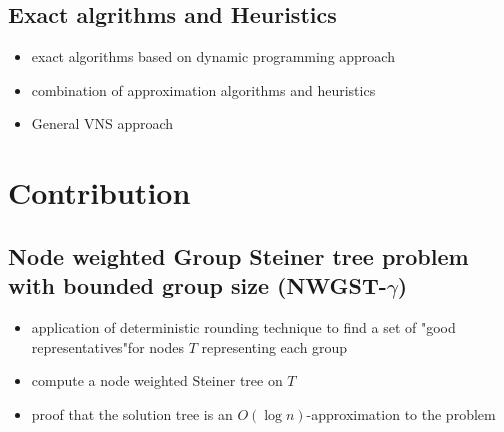\documentclass{beamer}
\begin{document}
\subsection*{Exact algrithms and Heuristics}
\begin{frame}{\insertsection}{\insertsubsection}
    \begin{block}{}
        \begin{itemize}
            \item exact algorithms based on dynamic programming approach\autocite{liEfficientProgressiveGroup2016}
            \item combination of approximation algorithms and heuristics \autocite{sunFindingGroupSteiner2021}
            \item General VNS approach\autocite{matijevicGeneralVariableNeighborhood2022}
        \end{itemize}
    \end{block}
\end{frame}


\section{Contribution}
\subsection*{Node weighted Group Steiner tree problem with bounded group size (NWGST-$\gamma$)}
\begin{frame}{\insertsection}{\insertsubsection}
    \begin{block}{}
        \begin{itemize}[<+->]
            \item application of deterministic rounding technique to find a set of "good representatives"for nodes $T$ representing each group
            \item compute a node weighted Steiner tree on $T$
            \item proof that the solution tree is an $O(\log n)$-approximation to the problem\autocite{guhaEfficientRecoveryPower1999}
        \end{itemize}
    \end{block}
\end{frame}
\end{document}
